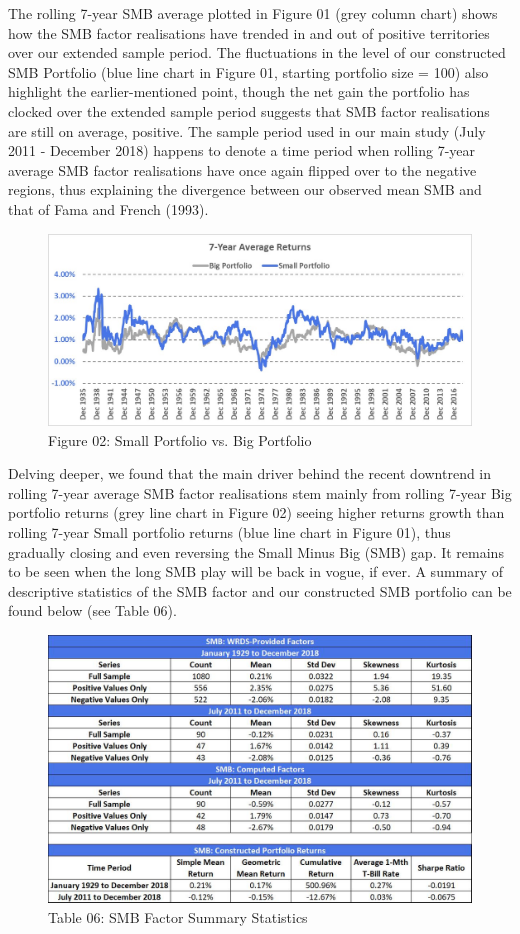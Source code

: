 \documentclass[12pt]{article}
\begin{document}
\noindent The rolling 7-year SMB average plotted in Figure 01 (grey column chart) shows how the SMB factor realisations have trended in and out of positive territories over our extended sample period. The fluctuations in the level of our constructed SMB Portfolio (blue line chart in Figure 01, starting portfolio size = 100) also highlight the earlier-mentioned point, though the net gain the portfolio has clocked over the extended sample period suggests that SMB factor realisations are still on average, positive. The sample period used in our main study (July 2011 - December 2018) happens to denote a time period when rolling 7-year average SMB factor realisations have once again flipped over to the negative regions, thus explaining the divergence between our observed mean SMB and that of Fama and French (1993).

\begin{figure}[h]
	\centering
	\includegraphics[width=0.9\linewidth]{SMB02}
	\caption*{Figure 02: Small Portfolio vs. Big Portfolio}
	\label{fig:label}
\end{figure}

\noindent Delving deeper, we found that the main driver behind the recent downtrend in rolling 7-year average SMB factor realisations stem mainly from rolling 7-year Big portfolio returns (grey line chart in Figure 02) seeing higher returns growth than rolling 7-year Small portfolio returns (blue line chart in Figure 01), thus gradually closing and even reversing the Small Minus Big (SMB) gap.  It remains to be seen when the long SMB play will be back in vogue, if ever. A summary of descriptive statistics of the SMB factor and our constructed SMB portfolio can be found below (see Table 06).

\newpage

\begin{figure}[h]
	\centering
	\includegraphics[width=0.8\linewidth]{SMB03}
	\caption*{Table 06: SMB Factor Summary Statistics}
	\label{fig:label}
\end{figure}
\end{document}
